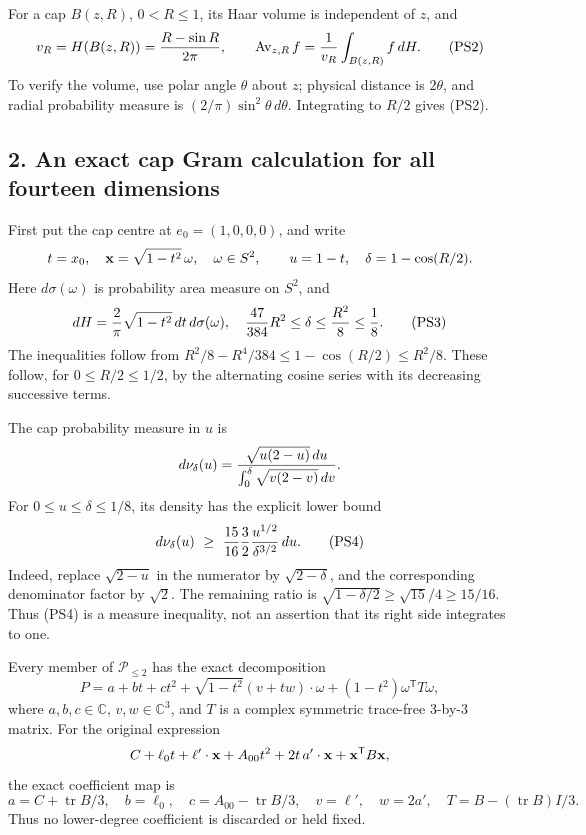 \documentclass[11pt]{article}
\begin{document}
For a cap \(B(z,R)\), \(0<R\le1\), its Haar volume is independent
of \(z\), and
\[
 v_R=H(B(z,R))={R-\sin R\over2\pi},\qquad
 \operatorname{Av}_{z,R}f={1\over v_R}\int_{B(z,R)}f\,dH.
 \tag{PS2}
\]
To verify the volume, use polar angle \(\theta\) about \(z\);
physical distance is \(2\theta\), and radial probability measure is
\((2/\pi)\sin^2\theta\,d\theta\). Integrating to \(R/2\) gives (PS2).

\subsection*{2. An exact cap Gram calculation for all fourteen dimensions}

First put the cap centre at \(e_0=(1,0,0,0)\), and write
\[
 t=x_0,\quad {\bf x}=\sqrt{1-t^2}\,\omega,\quad \omega\in S^2,
 \qquad u=1-t,\quad \delta=1-\cos(R/2).
\]
Here \(d\sigma(\omega)\) is probability area measure on \(S^2\), and
\[
 dH={2\over\pi}\sqrt{1-t^2}\,dt\,d\sigma(\omega),\quad
 {47\over384}R^2\le\delta\le {R^2\over8}\le{1\over8}.
 \tag{PS3}
\]
The inequalities follow from
\(R^2/8-R^4/384\le1-\cos(R/2)\le R^2/8\).
These follow, for \(0\le R/2\le1/2\), by the alternating cosine
series with its decreasing successive terms.

The cap probability measure in \(u\) is
\[
 d\nu_\delta(u)=
 {\sqrt{u(2-u)}\,du\over\int_0^\delta\sqrt{v(2-v)}\,dv}.
\]
For \(0\le u\le\delta\le1/8\), its density has the explicit lower
bound
\[
 d\nu_\delta(u)\ \ge\
 {15\over16}{3\over2}{u^{1/2}\over\delta^{3/2}}\,du.
 \tag{PS4}
\]
Indeed, replace \(\sqrt{2-u}\) in the numerator by
\(\sqrt{2-\delta}\), and the corresponding denominator factor by
\(\sqrt2\). The remaining ratio is
\(\sqrt{1-\delta/2}\ge\sqrt{15}/4\ge15/16\).
Thus (PS4) is a measure inequality, not an assertion that its
right side integrates to one.

Every member of \(\mathcal P_{\le2}\) has the exact decomposition
\[
 P=a+bt+ct^2+\sqrt{1-t^2}(v+tw)\cdot\omega
                  +(1-t^2)\omega^{\mathsf T}T\omega,
 \tag{PS5}
\]
where \(a,b,c\in\mathbb C\), \(v,w\in\mathbb C^3\), and
\(T\) is a complex symmetric trace-free \(3\)-by-\(3\) matrix.
For the original expression
\[
 C+\ell_0t+\ell'\cdot{\bf x}+A_{00}t^2
       +2t\,a'\cdot{\bf x}+{\bf x}^{\mathsf T}B{\bf x},
\]
the exact coefficient map is
\[
 a=C+\operatorname{tr}B/3,\quad b=\ell_0,\quad
 c=A_{00}-\operatorname{tr}B/3,\quad
 v=\ell',\quad w=2a',\quad T=B-(\operatorname{tr}B)I/3.
\]
Thus no lower-degree coefficient is discarded or held fixed.
\end{document}
